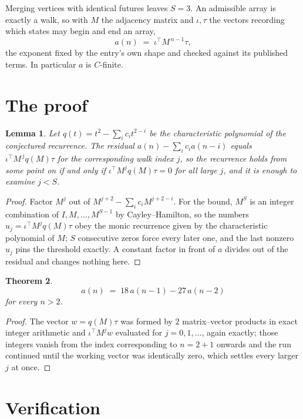 \documentclass[11pt,a4paper]{article}
\theoremstyle{plain}
\newtheorem{theorem}{Theorem}
\newtheorem{lemma}[theorem]{Lemma}
\theoremstyle{definition}
\begin{document}
Merging vertices with identical futures leaves $S=3$. An admissible array is exactly a walk, so with $M$ the adjacency matrix and $\iota,\tau$ the vectors recording which states may begin and end an array,
\[
a(n)\;=\;\iota^{\!\top}M^{\,n-1}\tau ,
\]
the exponent fixed by the entry's own shape and checked against its published terms. In
particular $a$ is $C$-finite.

\section{The proof}

\begin{lemma}\label{lem:crit}
Let $q(t)=t^{2}-\sum_i c_it^{2-i}$ be the characteristic polynomial of the
conjectured recurrence. The residual $a(n)-\sum_ic_ia(n-i)$ equals
$\iota^{\!\top}M^{\,j}q(M)\tau$ for the corresponding walk index $j$, so the recurrence
holds from some point on if and only if $\iota^{\!\top}M^{j}q(M)\tau=0$ for all large $j$,
and it is enough to examine $j<S$.
\end{lemma}

\begin{proof}
Factor $M^{j}$ out of $M^{j+2}-\sum_ic_iM^{j+2-i}$. For the bound, $M^{S}$
is an integer combination of $I,M,\dots,M^{S-1}$ by Cayley--Hamilton, so the numbers
$u_j=\iota^{\!\top}M^{j}q(M)\tau$ obey the monic recurrence given by the characteristic
polynomial of $M$; $S$ consecutive zeros force every later one, and the last nonzero $u_j$
pins the threshold exactly. A constant factor in front of $a$ divides out of the residual and
changes nothing here.
\end{proof}

\begin{theorem}
\[
a(n)\;=\;18\,a(n-1) - 27\,a(n-2)
\]
for every $n>2$.
\end{theorem}

\begin{proof}
The vector $w=q(M)\tau$ was formed by $2$ matrix--vector products in exact integer
arithmetic and $\iota^{\!\top}M^{j}w$ evaluated for $j=0,1,\dots$, again exactly; those
integers vanish from the index corresponding to $n=2+1$ onwards and the run continued
until the working vector was identically zero, which settles every larger $j$ at once.
\end{proof}

\section{Verification}
\end{document}
